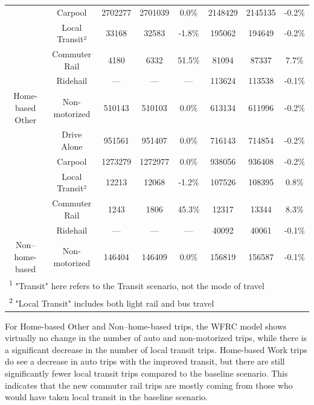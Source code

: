 \documentclass[fancy, twoside, mastersfancy, ms]{byuthesis}
\begin{document}
\begin{table}
{{\begin{tabular}[t]{cccccccc}
 & Carpool & 2702277 & 2701039 & 0.0\% & 2148429 & 2145135 & -0.2\%\\

 & Local Transit² & 33168 & 32583 & -1.8\% & 195062 & 194649 & -0.2\%\\

 & Commuter Rail & 4180 & 6332 & 51.5\% & 81094 & 87337 & 7.7\%\\

 & Ridehail & — & — & — & 113624 & 113538 & -0.1\%\\

\multirow{-6}{*}{\centering\arraybackslash Home-based Other} & Non-motorized & 510143 & 510103 & 0.0\% & 613134 & 611996 & -0.2\%\\
\cmidrule{1-8}
 & Drive Alone & 951561 & 951407 & 0.0\% & 716143 & 714854 & -0.2\%\\

 & Carpool & 1273279 & 1272977 & 0.0\% & 938056 & 936408 & -0.2\%\\

 & Local Transit² & 12213 & 12068 & -1.2\% & 107526 & 108395 & 0.8\%\\

 & Commuter Rail & 1243 & 1806 & 45.3\% & 12317 & 13344 & 8.3\%\\

 & Ridehail & — & — & — & 40092 & 40061 & -0.1\%\\

\multirow{-6}{*}{\centering\arraybackslash Non–home-based} & Non-motorized & 146404 & 146409 & 0.0\% & 156819 & 156587 & -0.1\%\\
\bottomrule
\multicolumn{8}{l}{\rule{0pt}{1em}\textsuperscript{1} "Transit" here refers to the Transit scenario, not the mode of travel}\\
\multicolumn{8}{l}{\rule{0pt}{1em}\textsuperscript{2} "Local Transit" includes both light rail and bus travel}\\
\end{tabular}}

}

\end{table}%

For Home-based Other and Non--home-based trips, the WFRC model shows
virtually no change in the number of auto and non-motorized trips, while
there is a significant decrease in the number of local transit trips.
Home-based Work trips do see a decrease in auto trips with the improved
transit, but there are still significantly fewer local transit trips
compared to the baseline scenario. This indicates that the new commuter
rail trips are mostly coming from those who would have taken local
transit in the baseline scenario.
\end{document}
